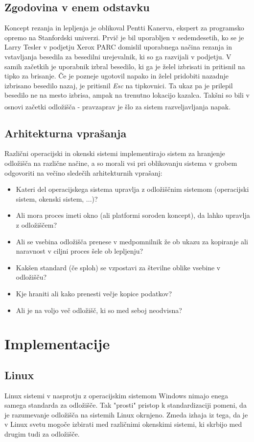 \documentclass[12pt, A4]{article}
\begin{document}
	
	\subsection{Zgodovina v enem odstavku}
	Koncept rezanja in lepljenja je oblikoval Pentti Kanerva, ekspert za programsko opremo na Stanfordski univerzi. Prvič je bil uporabljen v sedemdesetih, ko se je Larry Tesler v podjetju Xerox PARC domislil uporabnega načina rezanja in vstavljanja besedila za besedilni urejevalnik, ki so ga razvijali v podjetju. V samih začetkih je uporabnik izbral besedilo, ki ga je želel izbrisati in pritisnil na tipko za brisanje. Če je pozneje ugotovil napako in želel pridobiti nazadnje izbrisano besedilo nazaj, je pritisnil \textit{Esc} na tipkovnici. Ta ukaz pa je prilepil besedilo ne na mesto izbrisa, ampak na trenutno lokacijo kazalca. Takšni so bili v osnovi začetki odložišča - pravzaprav je šlo za sistem razveljavljanja napak\textsuperscript{\cite{designingiteractions}}.
	
	
	\subsection{Arhitekturna vprašanja}
	Različni operacijski in okenski sistemi implementirajo sistem za hranjenje odložišča na različne načine, a so morali vsi pri oblikovanju sistema v grobem odgovoriti na večino sledečih arhitekturnih vprašanj:
	\begin{itemize}
		\item Kateri del operacijskega sistema upravlja z odložiščnim sistemom (operacijski sistem, okenski sistem, ...)?
		\item Ali mora proces imeti okno (ali platformi soroden koncept), da lahko upravlja z odložiščem?
		\item Ali se vsebina odložišča prenese v medpomnilnik že ob ukazu za kopiranje ali naravnost v ciljni proces šele ob lepljenju?
		\item Kakšen standard (če sploh) se vzpostavi za številne oblike vsebine v odložišču?
		\item Kje hraniti ali kako prenesti večje kopice podatkov?
		\item Ali je na voljo več odložišč, ki so med seboj neodvisna?
	\end{itemize}
	
	
	\pagebreak
	\section{Implementacije}
	\subsection{Linux}
	Linux sistemi v nasprotju z operacijskim sistemom Windows nimajo enega samega standarda za odložišče. Tak "prosti" pristop k standardizaciji pomeni, da je razumevanje odložišča na sistemih Linux okrnjeno.
	Zmeda izhaja iz tega, da je v Linux svetu mogoče izbirati med različnimi okenskimi sistemi, ki skrbijo med drugim tudi za odložišče. \\
	
\end{document}
